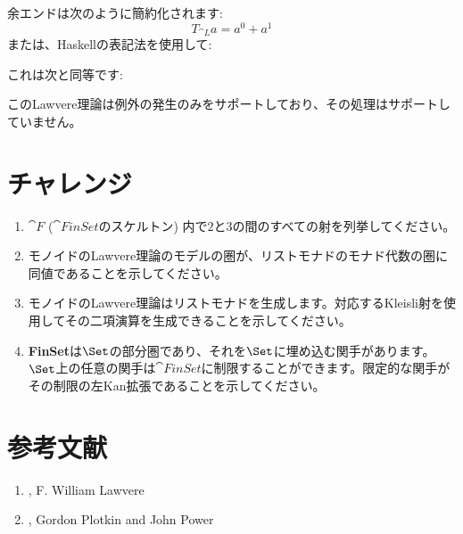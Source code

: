余エンドは次のように簡約化されます: 
\[T_{\cat{L}} a = a^0 + a^1\]
または、Haskellの表記法を使用して: 

これは次と同等です: 

このLawvere理論は例外の発生のみをサポートしており、その処理はサポートしていません。

\section{チャレンジ}

\begin{enumerate}
  \tightlist
  \item
        $\cat{F}$ ($\cat{FinSet}$のスケルトン) 内で$2$と$3$の間のすべての射を列挙してください。
  \item
        モノイドのLawvere理論のモデルの圏が、リストモナドのモナド代数の圏に同値であることを示してください。
  \item
        モノイドのLawvere理論はリストモナドを生成します。対応するKleisli射を使用してその二項演算を生成できることを示してください。
  \item
        \textbf{FinSet}は$\Set$の部分圏であり、それを$\Set$に埋め込む関手があります。$\Set$上の任意の関手は$\cat{FinSet}$に制限することができます。限定的な関手がその制限の左Kan拡張であることを示してください。
\end{enumerate}

\section{参考文献}
\begin{enumerate}
  \tightlist
  \item
        , F. William Lawvere
  \item
        , Gordon Plotkin and John Power
\end{enumerate}





